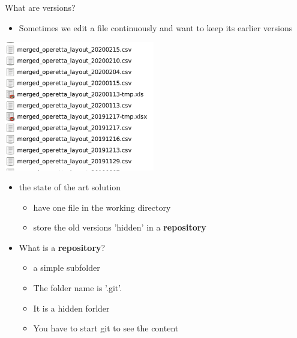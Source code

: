 \documentclass[aspectratio=169]{beamer}
\begin{document}
\begin{frame}

What are versions? 


\begin{itemize}
\item Sometimes we edit a file continuously and want to keep its earlier versions
\end{itemize}
\includegraphics[height=160pt]{pictures/Screenshot_2020-02-25_17-47-03-ugly_folder-zoom_in.png}

\end{frame}

\begin{frame}

\begin{itemize}
	\item the state of the art solution
	\begin{itemize}
		\item  have one file in the working directory
		\item store the old versions 'hidden' in a \textbf{repository}
	\end{itemize}
	\pause
	\item What is a \textbf{repository}?
	\begin{itemize}
		\item  a simple subfolder 
		\item The folder name is '.git'.
		\item It is a hidden forlder
		\item You have to start git to see the content
	\end{itemize}
\end{itemize}

\end{frame}
\end{document}

